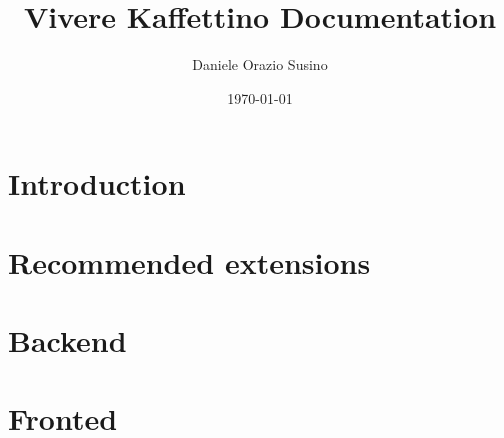 \documentclass{article}
\begin{document}
\title{Vivere Kaffettino Documentation}
\author{ Daniele Orazio Susino}
\date{\today}

\maketitle

\newpage

\tableofcontents

\newpage

\section{Introduction}
\section{Recommended extensions}
\section{Backend}
\section{Fronted}
\end{document}
